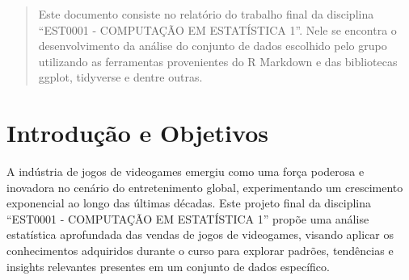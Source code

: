 \documentclass[draft]{agujournal2018}
\begin{document}


\begin{keypoints}
\end{keypoints}

%
%


\begin{abstract}
Este documento consiste no relatório do trabalho final da disciplina
``EST0001 - COMPUTAÇÃO EM ESTATÍSTICA 1''. Nele se encontra o
desenvolvimento da análise do conjunto de dados escolhido pelo grupo
utilizando as ferramentas provenientes do R Markdown e das bibliotecas
ggplot, tidyverse e dentre outras.
\end{abstract}
\section{Introdução e Objetivos}

A indústria de jogos de videogames emergiu como uma força poderosa e
inovadora no cenário do entretenimento global, experimentando um
crescimento exponencial ao longo das últimas décadas. Este projeto final
da disciplina ``EST0001 - COMPUTAÇÃO EM ESTATÍSTICA 1'' propõe uma
análise estatística aprofundada das vendas de jogos de videogames,
visando aplicar os conhecimentos adquiridos durante o curso para
explorar padrões, tendências e insights relevantes presentes em um
conjunto de dados específico.
\end{document}
